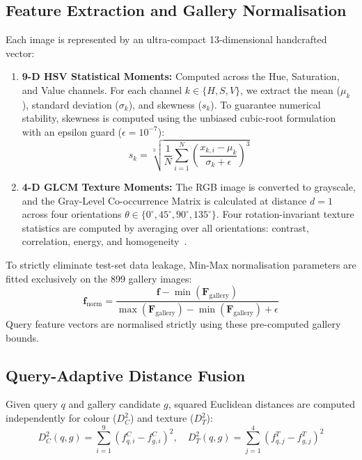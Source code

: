 \documentclass[pdflatex,sn-mathphys-num]{sn-jnl}
\begin{document}
\subsection{Feature Extraction and Gallery Normalisation}
Each image is represented by an ultra-compact 13-dimensional handcrafted vector:
\begin{enumerate}
    \item \textbf{9-D HSV Statistical Moments:} Computed across the Hue, Saturation, and Value channels. For each channel $k \in \{H, S, V\}$, we extract the mean ($\mu_k$), standard deviation ($\sigma_k$), and skewness ($s_k$). To guarantee numerical stability, skewness is computed using the unbiased cubic-root formulation with an epsilon guard ($\epsilon = 10^{-7}$):
    \begin{equation}
    s_k = \sqrt[3]{\frac{1}{N} \sum_{i=1}^N \left(\frac{x_{k,i} - \mu_k}{\sigma_k + \epsilon}\right)^3}
    \end{equation}
    \item \textbf{4-D GLCM Texture Moments:} The RGB image is converted to grayscale, and the Gray-Level Co-occurrence Matrix is calculated at distance $d=1$ across four orientations $\theta \in \{0^\circ, 45^\circ, 90^\circ, 135^\circ\}$. Four rotation-invariant texture statistics are computed by averaging over all orientations: contrast, correlation, energy, and homogeneity~\cite{chun2008cbir}.
\end{enumerate}

To strictly eliminate test-set data leakage, Min-Max normalisation parameters are fitted exclusively on the 899 gallery images:
\begin{equation}
\mathbf{f}_{\text{norm}} = \frac{\mathbf{f} - \min(\mathbf{F}_{\text{gallery}})}{\max(\mathbf{F}_{\text{gallery}}) - \min(\mathbf{F}_{\text{gallery}}) + \epsilon}
\end{equation}
Query feature vectors are normalised strictly using these pre-computed gallery bounds.

\subsection{Query-Adaptive Distance Fusion}
Given query $q$ and gallery candidate $g$, squared Euclidean distances are computed independently for colour ($D_C^2$) and texture ($D_T^2$):
\begin{equation}
D_C^2(q, g) = \sum_{i=1}^9 (f_{q,i}^C - f_{g,i}^C)^2, \quad D_T^2(q, g) = \sum_{j=1}^4 (f_{q,j}^T - f_{g,j}^T)^2
\end{equation}
\end{document}
